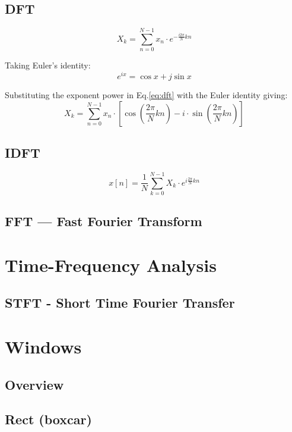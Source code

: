 \subsection{DFT}
\begin{equation}
    \label{eq:dft}
    X_k = \sum_{n=0}^{N-1} x_n \cdot e^{-\frac {i 2\pi}{N}kn}
\end{equation}

Taking Euler's identity:
\begin{equation}
    e^{ix} = \cos x + j\sin x
\end{equation}

Substituting the exponent power in Eq.\ref{eq:dft} with the Euler identity
giving:
\begin{equation}
    X_k = \sum_{n=0}^{N-1} x_n \cdot \left[\cos\left(\frac{2 \pi}{N}kn\right)
        - i \cdot \sin\left(\frac{2 \pi}{N}kn\right)\right]
\end{equation}


\subsection{IDFT}
\begin{equation}
    x[n] = \frac{1}{N} \sum_{k=0}^{N-1} X_k\cdot e^{i \frac{2 \pi}{N} k n}
\end{equation}


\subsection{FFT --- Fast Fourier Transform}

\section{Time-Frequency Analysis}
\subsection{STFT - Short Time Fourier Transfer}

\section{Windows}
\subsection{Overview}

\subsection{Rect (boxcar)}
